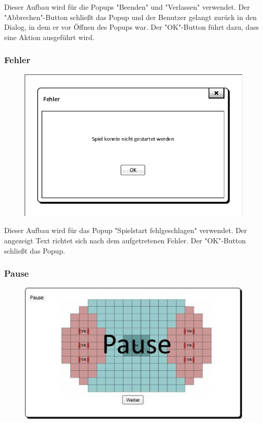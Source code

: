 Dieser Aufbau wird für die Popups "Beenden" und "Verlassen" verwendet. Der "Abbrechen"-Button schließt das Popup und der Benutzer gelangt zurück in den Dialog, in dem er vor Öffnen des Popups war. Der "OK"-Button führt dazu, dass eine Aktion ausgeführt wird.

\subsubsection{Fehler}
\begin{figure}[H]
	\centering
	\includegraphics[scale=0.8]{images/Fehler_Popup.pdf}
\end{figure}

Dieser Aufbau wird für das Popup "Spielstart fehlgeschlagen" verwendet. Der angezeigt Text richtet sich nach dem aufgetretenen Fehler. Der "OK"-Button schließt das Popup.

\subsubsection{Pause}
\begin{figure}[H]
	\centering
	\includegraphics[scale=0.8]{images/Pause.pdf}
\end{figure}

